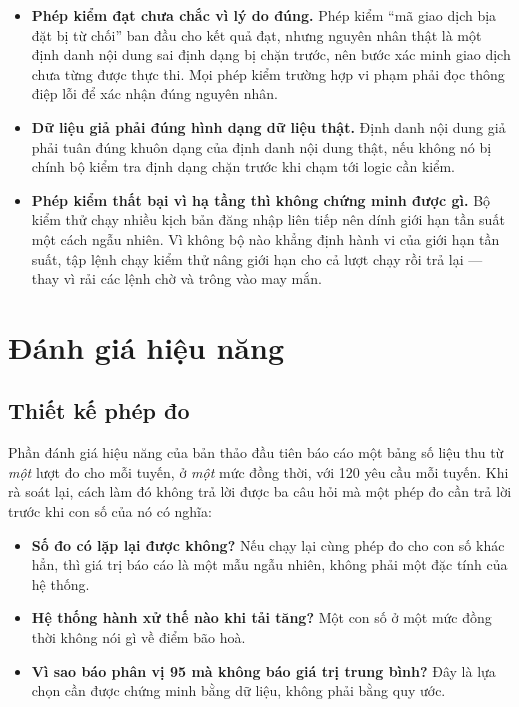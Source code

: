 \begin{itemize}
    \item \textbf{Phép kiểm đạt chưa chắc vì lý do đúng.} Phép kiểm {``}mã giao dịch bịa đặt bị từ chối{''} ban đầu cho kết quả đạt, nhưng nguyên nhân thật là một định danh nội dung sai định dạng bị chặn trước, nên bước xác minh giao dịch chưa từng được thực thi. Mọi phép kiểm trường hợp vi phạm phải đọc thông điệp lỗi để xác nhận đúng nguyên nhân.
    \item \textbf{Dữ liệu giả phải đúng hình dạng dữ liệu thật.} Định danh nội dung giả phải tuân đúng khuôn dạng của định danh nội dung thật, nếu không nó bị chính bộ kiểm tra định dạng chặn trước khi chạm tới logic cần kiểm.
    \item \textbf{Phép kiểm thất bại vì hạ tầng thì không chứng minh được gì.} Bộ kiểm thử chạy nhiều kịch bản đăng nhập liên tiếp nên dính giới hạn tần suất một cách ngẫu nhiên. Vì không bộ nào khẳng định hành vi của giới hạn tần suất, tập lệnh chạy kiểm thử nâng giới hạn cho cả lượt chạy rồi trả lại --- thay vì rải các lệnh chờ và trông vào may mắn.
\end{itemize}

\section{Đánh giá hiệu năng}

\subsection{Thiết kế phép đo}

Phần đánh giá hiệu năng của bản thảo đầu tiên báo cáo một bảng số liệu thu từ \emph{một} lượt đo cho mỗi tuyến, ở \emph{một} mức đồng thời, với 120 yêu cầu mỗi tuyến. Khi rà soát lại, cách làm đó không trả lời được ba câu hỏi mà một phép đo cần trả lời trước khi con số của nó có nghĩa:

\begin{itemize}
    \item \textbf{Số đo có lặp lại được không?} Nếu chạy lại cùng phép đo cho con số khác hẳn, thì giá trị báo cáo là một mẫu ngẫu nhiên, không phải một đặc tính của hệ thống.
    \item \textbf{Hệ thống hành xử thế nào khi tải tăng?} Một con số ở một mức đồng thời không nói gì về điểm bão hoà.
    \item \textbf{Vì sao báo phân vị 95 mà không báo giá trị trung bình?} Đây là lựa chọn cần được chứng minh bằng dữ liệu, không phải bằng quy ước.
\end{itemize}


